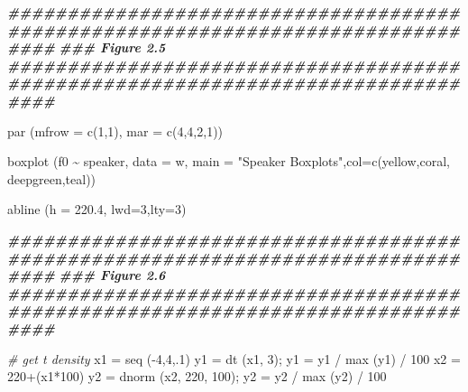 \documentclass[
]{book}
\newenvironment{Shaded}{\begin{snugshade}}{\end{snugshade}}
\newcommand{\AttributeTok}[1]{\textcolor[rgb]{0.77,0.63,0.00}{#1}}
\newcommand{\CommentTok}[1]{\textcolor[rgb]{0.56,0.35,0.01}{\textit{#1}}}
\newcommand{\DecValTok}[1]{\textcolor[rgb]{0.00,0.00,0.81}{#1}}
\newcommand{\DocumentationTok}[1]{\textcolor[rgb]{0.56,0.35,0.01}{\textbf{\textit{#1}}}}
\newcommand{\FloatTok}[1]{\textcolor[rgb]{0.00,0.00,0.81}{#1}}
\newcommand{\FunctionTok}[1]{\textcolor[rgb]{0.00,0.00,0.00}{#1}}
\newcommand{\NormalTok}[1]{#1}
\newcommand{\OtherTok}[1]{\textcolor[rgb]{0.56,0.35,0.01}{#1}}
\newcommand{\SpecialCharTok}[1]{\textcolor[rgb]{0.00,0.00,0.00}{#1}}
\newcommand{\StringTok}[1]{\textcolor[rgb]{0.31,0.60,0.02}{#1}}
\begin{document}
\begin{Shaded}
\begin{Highlighting}[]
\DocumentationTok{\#\#\#\#\#\#\#\#\#\#\#\#\#\#\#\#\#\#\#\#\#\#\#\#\#\#\#\#\#\#\#\#\#\#\#\#\#\#\#\#\#\#\#\#\#\#\#\#\#\#\#\#\#\#\#\#\#\#\#\#\#\#\#\#\#\#\#\#\#\#\#\#\#\#\#\#\#\#\#\#}
\DocumentationTok{\#\#\# Figure 2.5}
\DocumentationTok{\#\#\#\#\#\#\#\#\#\#\#\#\#\#\#\#\#\#\#\#\#\#\#\#\#\#\#\#\#\#\#\#\#\#\#\#\#\#\#\#\#\#\#\#\#\#\#\#\#\#\#\#\#\#\#\#\#\#\#\#\#\#\#\#\#\#\#\#\#\#\#\#\#\#\#\#\#\#\#\#}

\FunctionTok{par}\NormalTok{ (}\AttributeTok{mfrow =} \FunctionTok{c}\NormalTok{(}\DecValTok{1}\NormalTok{,}\DecValTok{1}\NormalTok{), }\AttributeTok{mar =} \FunctionTok{c}\NormalTok{(}\DecValTok{4}\NormalTok{,}\DecValTok{4}\NormalTok{,}\DecValTok{2}\NormalTok{,}\DecValTok{1}\NormalTok{))}

\FunctionTok{boxplot}\NormalTok{ (f0 }\SpecialCharTok{\textasciitilde{}}\NormalTok{ speaker, }\AttributeTok{data =}\NormalTok{ w, }\AttributeTok{main =} \StringTok{"Speaker Boxplots"}\NormalTok{,}\AttributeTok{col=}\FunctionTok{c}\NormalTok{(yellow,coral,}
\NormalTok{         deepgreen,teal)) }

\FunctionTok{abline}\NormalTok{ (}\AttributeTok{h =} \FloatTok{220.4}\NormalTok{, }\AttributeTok{lwd=}\DecValTok{3}\NormalTok{,}\AttributeTok{lty=}\DecValTok{3}\NormalTok{)}

\DocumentationTok{\#\#\#\#\#\#\#\#\#\#\#\#\#\#\#\#\#\#\#\#\#\#\#\#\#\#\#\#\#\#\#\#\#\#\#\#\#\#\#\#\#\#\#\#\#\#\#\#\#\#\#\#\#\#\#\#\#\#\#\#\#\#\#\#\#\#\#\#\#\#\#\#\#\#\#\#\#\#\#\#}
\DocumentationTok{\#\#\# Figure 2.6}
\DocumentationTok{\#\#\#\#\#\#\#\#\#\#\#\#\#\#\#\#\#\#\#\#\#\#\#\#\#\#\#\#\#\#\#\#\#\#\#\#\#\#\#\#\#\#\#\#\#\#\#\#\#\#\#\#\#\#\#\#\#\#\#\#\#\#\#\#\#\#\#\#\#\#\#\#\#\#\#\#\#\#\#\#}

\CommentTok{\# get t density}
\NormalTok{x1 }\OtherTok{=} \FunctionTok{seq}\NormalTok{ (}\SpecialCharTok{{-}}\DecValTok{4}\NormalTok{,}\DecValTok{4}\NormalTok{,.}\DecValTok{1}\NormalTok{)}
\NormalTok{y1 }\OtherTok{=} \FunctionTok{dt}\NormalTok{ (x1, }\DecValTok{3}\NormalTok{); y1 }\OtherTok{=}\NormalTok{ y1 }\SpecialCharTok{/} \FunctionTok{max}\NormalTok{ (y1) }\SpecialCharTok{/} \DecValTok{100}
\NormalTok{x2 }\OtherTok{=} \DecValTok{220}\SpecialCharTok{+}\NormalTok{(x1}\SpecialCharTok{*}\DecValTok{100}\NormalTok{)}
\NormalTok{y2 }\OtherTok{=} \FunctionTok{dnorm}\NormalTok{ (x2, }\DecValTok{220}\NormalTok{, }\DecValTok{100}\NormalTok{); y2 }\OtherTok{=}\NormalTok{ y2 }\SpecialCharTok{/} \FunctionTok{max}\NormalTok{ (y2) }\SpecialCharTok{/} \DecValTok{100}


\end{Highlighting}
\end{Shaded}
\end{document}

